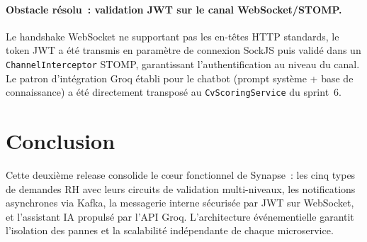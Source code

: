 \paragraph{Obstacle résolu~: validation JWT sur le canal WebSocket/STOMP.}
Le handshake WebSocket ne supportant pas les en-têtes HTTP standards, le token JWT a été transmis en paramètre de connexion SockJS puis validé dans un \texttt{ChannelInterceptor} STOMP, garantissant l'authentification au niveau du canal. Le patron d'intégration Groq établi pour le chatbot (prompt système + base de connaissance) a été directement transposé au \texttt{CvScoringService} du sprint~6.

\section{Conclusion}

Cette deuxième release consolide le cœur fonctionnel de Synapse~: les cinq types
de demandes RH avec leurs circuits de validation multi-niveaux, les notifications
asynchrones via Kafka, la messagerie interne sécurisée par JWT sur WebSocket, et
l’assistant IA propulsé par l’API Groq. L’architecture événementielle garantit
l’isolation des pannes et la scalabilité indépendante de chaque microservice.

